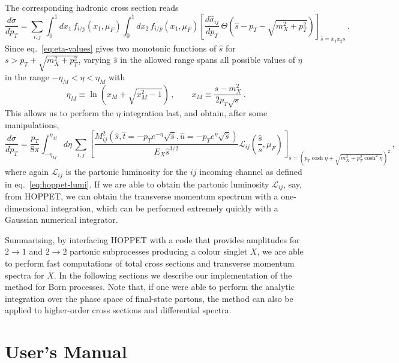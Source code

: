 \documentclass[12pt]{article}
\begin{document}
The corresponding hadronic cross section reads
\begin{equation}
\label{eq:hadronic-pt}
  \frac{d\sigma}{dp_T} = \sum_{i,j} \int_0^1 dx_1\, f_{i/p}(x_1,\mu_F)\int_0^1 dx_2 \, f_{i/p}(x_1,\mu_F) \left[\frac{d\hat \sigma_{ij}}{dp_T}\, \Theta\left(\hat s-p_T-\sqrt{m_X^2+p^2_T}\right)  \right]_{\hat s=x_1x_2 s}\,.
\end{equation}
Since eq.~\eqref{eq:eta-values} gives two monotonic functions of $\hat s$ for $s>p_T+\sqrt{m_X^2+p^2_T}$, varying $\hat s$ in the allowed range spans all possible values of $\eta$ in the range $-\eta_M<\eta<\eta_M$ with
\begin{equation}
\label{eq:eta-range}
\eta_M \equiv \ln \left ( x_M + \sqrt{x_M^2-1} \right ) \,, \qquad x_M\equiv\frac{s-m_X^2}{2 p_T \sqrt{s}} \,.
\end{equation}
This allows us to perform the $\eta$ integration last, and obtain, after some
manipulations,
\begin{equation}
\label{eq:hadronic-pt-lumi}
  \frac{d\sigma}{dp_T} = \frac{p_T}{8 \pi}\int_{-\eta_M}^{\eta_M}\!d\eta\, \sum_{i,j}  \left[\frac{M^2_{ij}\left(\hat s,\hat t=-p_T e^{-\eta}\sqrt {\hat s}  ,\hat u =- p_T e^{\eta}\sqrt{\hat s}\right)}{E_X \hat s^{3/2}}\mathcal{L}_{ij}\left(\frac{\hat s}{s},\mu_F\right) \right]_{\hat s=\left(p_T\cosh\eta+\sqrt{m_X^2+p^2_T\cosh^2\eta}\right)^2}\,,
\end{equation}
where again $\mathcal{L}_{ij}$ is the partonic luminosity for the $ij$
incoming channel as defined in eq.~\eqref{eq:hoppet-lumi}. If we are
able to obtain the partonic luminosity $\mathcal{L}_{ij}$, say, from
\textsc{HOPPET}, we can obtain the transverse momentum spectrum with a
one-dimensional integration, which can be performed extremely quickly
with a Gaussian numerical integrator.

Summarising, by interfacing \textsc{HOPPET} with a code that provides
amplitudes for $2\to 1$ and $2\to 2$ partonic subprocesses producing a
colour singlet $X$, we are able to perform fast computations of total
cross sections and transverse momentum spectra for $X$. In the
following sections we describe our implementation of the method for
Born processes. Note that, if one were able to perform the analytic
integration over the phase space of final-state partons, the method
can also be applied to higher-order cross sections and differential
spectra.

\section{User's Manual}
\label{sec:manual} 
\end{document}
